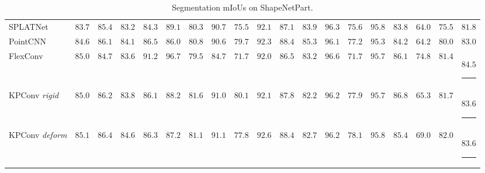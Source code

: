 \documentclass[10pt,twocolumn,letterpaper]{article}
\newcommand\Tstrut{\rule{-3pt}{2.6ex}}       %
\newcommand\Bstrut{\rule[-0.9ex]{-3pt}{0pt}} %
\begin{document}
\begin{table}[b]
\begin{small}
\begin{center}
\begin{tabular}{L{2.5cm} | C{0.9cm} | C{0.9cm} | *{16}{C{0.75cm}}}
SPLATNet \cite{su2018splatnet}	& $83.7$	& $85.4$	& $83.2$	& $84.3$	& $89.1$	& $80.3$	& $90.7$	& $75.5$	& $92.1$	& $87.1$	& $83.9$	& $96.3$	& $75.6$	& $\mathbf{95.8}$	& $83.8$	& $64.0$	& $75.5$	& $81.8$	\\
PointCNN \cite{li2018pointcnn}	& $84.6$	& $86.1$	& $84.1$	& $86.5$	& $86.0$	& $80.8$	& $90.6$	& $79.7$	& $92.3$	& $88.4$	& $\mathbf{85.3}$	& $96.1$	& $77.2$	& $95.3$	& $84.2$	& $64.2$	& $80.0$	& $83.0$	\\
FlexConv \cite{groh2018flex}	& $85.0$	& $84.7$	& $83.6$	& $\mathbf{91.2}$	& $\mathbf{96.7}$	& $79.5$	& $84.7$	& $71.7$	& $92.0$	& $86.5$	& $83.2$	& $\mathbf{96.6}$	& $71.7$	& $95.7$	& $86.1$	& $\mathbf{74.8}$	& $81.4$	& $\mathbf{84.5}$	\Bstrut\\
\hline
KPConv \textit{rigid}	& $85.0$	& $86.2$	& $83.8$	& $86.1$	& $88.2$	& $\mathbf{81.6}$	& $91.0$	& $\mathbf{80.1}$	& $92.1$	& $87.8$	& $82.2$	& $96.2$	& $77.9$	& $95.7$	& $\mathbf{86.8}$	& $65.3$	& $81.7$	& $83.6$	\Tstrut\\
KPConv \textit{deform}	& $\mathbf{85.1}$	& $\mathbf{86.4}$	& $\mathbf{84.6}$	& $86.3$	& $87.2$	& $81.1$	& $91.1$	& $77.8$	& $92.6$	& $88.4$	& $82.7$	& $96.2$	& $\mathbf{78.1}$	& $\mathbf{95.8}$	& $85.4$	& $69.0$	& $82.0$	& $83.6$	\Bstrut\\
\hline
\end{tabular}
\end{center}
\end{small}
\caption{Segmentation mIoUs on ShapeNetPart.}
\label{Table_ShapeNetPart} 
\end{table}
\end{document}
